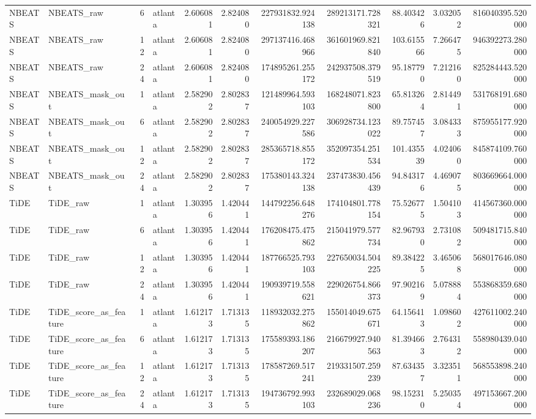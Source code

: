 \begin{longtable}{llrlrrrrrrr}
NBEATS & NBEATS\_raw & 6 & atlanta & 2.606081 & 2.824080 & 227931832.924138 & 289213171.728321 & 88.403426 & 3.032052 & 816040395.520000 \\
NBEATS & NBEATS\_raw & 12 & atlanta & 2.606081 & 2.824080 & 297137416.468966 & 361601969.821840 & 103.615566 & 7.266475 & 946392273.280000 \\
NBEATS & NBEATS\_raw & 24 & atlanta & 2.606081 & 2.824080 & 174895261.255172 & 242937508.379519 & 95.187790 & 7.212160 & 825284443.520000 \\
NBEATS & NBEATS\_mask\_out & 1 & atlanta & 2.582902 & 2.802837 & 121489964.593103 & 168248071.823800 & 65.813264 & 2.814491 & 531768191.680000 \\
NBEATS & NBEATS\_mask\_out & 6 & atlanta & 2.582902 & 2.802837 & 240054929.227586 & 306928734.123022 & 89.757457 & 3.084333 & 875955177.920000 \\
NBEATS & NBEATS\_mask\_out & 12 & atlanta & 2.582902 & 2.802837 & 285365718.855172 & 352097354.251534 & 101.435539 & 4.024060 & 845874109.760000 \\
NBEATS & NBEATS\_mask\_out & 24 & atlanta & 2.582902 & 2.802837 & 175380143.324138 & 237473830.456439 & 94.843176 & 4.469075 & 803669664.000000 \\
TiDE & TiDE\_raw & 1 & atlanta & 1.303956 & 1.420441 & 144792256.648276 & 174104801.778154 & 75.526775 & 1.504103 & 414567360.000000 \\
TiDE & TiDE\_raw & 6 & atlanta & 1.303956 & 1.420441 & 176208475.475862 & 215041979.577734 & 82.967930 & 2.731082 & 509481715.840000 \\
TiDE & TiDE\_raw & 12 & atlanta & 1.303956 & 1.420441 & 187766525.793103 & 227650034.504225 & 89.384225 & 3.465068 & 568017646.080000 \\
TiDE & TiDE\_raw & 24 & atlanta & 1.303956 & 1.420441 & 190939719.558621 & 229026754.866373 & 97.902169 & 5.078884 & 553868359.680000 \\
TiDE & TiDE\_score\_as\_feature & 1 & atlanta & 1.612173 & 1.713135 & 118932032.275862 & 155014049.675671 & 64.156413 & 1.098602 & 427611002.240000 \\
TiDE & TiDE\_score\_as\_feature & 6 & atlanta & 1.612173 & 1.713135 & 175589393.186207 & 216679927.940563 & 81.394663 & 2.764312 & 558980439.040000 \\
TiDE & TiDE\_score\_as\_feature & 12 & atlanta & 1.612173 & 1.713135 & 178587269.517241 & 219331507.259239 & 87.634357 & 3.323511 & 568553898.240000 \\
TiDE & TiDE\_score\_as\_feature & 24 & atlanta & 1.612173 & 1.713135 & 194736792.993103 & 232689029.068236 & 98.152310 & 5.250354 & 497153667.200000 \\

\end{longtable}

